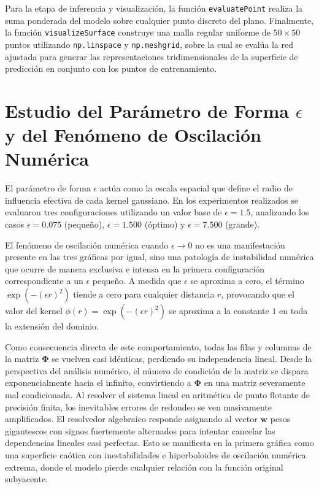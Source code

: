 \documentclass[12pt]{article}
\begin{document}
        Para la etapa de inferencia y visualización, la función \texttt{evaluatePoint} realiza la suma ponderada del modelo sobre cualquier punto discreto del plano. Finalmente, la función \texttt{visualizeSurface} construye una malla regular uniforme de $50 \times 50$ puntos utilizando \texttt{np.linspace} y \texttt{np.meshgrid}, sobre la cual se evalúa la red ajustada para generar las representaciones tridimensionales de la superficie de predicción en conjunto con los puntos de entrenamiento.

    \section{Estudio del Parámetro de Forma $\epsilon$ y del Fenómeno de Oscilación Numérica}
        El parámetro de forma $\epsilon$ actúa como la escala espacial que define el radio de influencia efectiva de cada kernel gaussiano. En los experimentos realizados se evaluaron tres configuraciones utilizando un valor base de $\epsilon = 1.5$, analizando los casos $\epsilon = 0.075$ (pequeño), $\epsilon = 1.500$ (óptimo) y $\epsilon = 7.500$ (grande).

        El fenómeno de oscilación numérica cuando $\epsilon \to 0$ no es una manifestación presente en las tres gráficas por igual, sino una patología de instabilidad numérica que ocurre de manera exclusiva e intensa en la primera configuración correspondiente a un $\epsilon$ pequeño. A medida que $\epsilon$ se aproxima a cero, el término $\exp(-(\epsilon r)^2)$ tiende a cero para cualquier distancia $r$, provocando que el valor del kernel $\phi(r) = \exp(-(\epsilon r)^2)$ se aproxima a la constante $1$ en toda la extensión del dominio.

        Como consecuencia directa de este comportamiento, todas las filas y columnas de la matriz $\mathbf{\Phi}$ se vuelven casi idénticas, perdiendo su independencia lineal. Desde la perspectiva del análisis numérico, el número de condición de la matriz se dispara exponencialmente hacia el infinito, convirtiendo a $\mathbf{\Phi}$ en una matriz severamente mal condicionada. Al resolver el sistema lineal en aritmética de punto flotante de precisión finita, los inevitables errores de redondeo se ven masivamente amplificados. El resolvedor algebraico responde asignando al vector $\mathbf{w}$ pesos gigantescos con signos fuertemente alternados para intentar cancelar las dependencias lineales casi perfectas. Esto se manifiesta en la primera gráfica como una superficie caótica con inestabilidades e hiperboloides de oscilación numérica extrema, donde el modelo pierde cualquier relación con la función original subyacente. 
\end{document}
